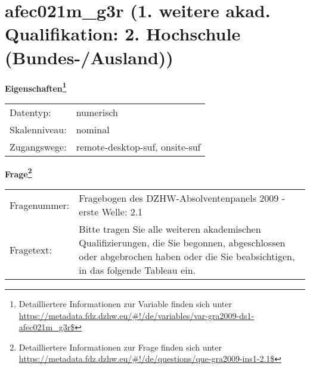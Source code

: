 
    \setcounter{footnote}{0}

    \vspace*{-1.8cm}
	\section{afec021m\_g3r (1. weitere akad. Qualifikation: 2. Hochschule (Bundes-/Ausland))}
	\label{section:afec021m_g3r}



    \vspace*{0.5cm}
    \noindent\textbf{Eigenschaften\footnote{Detailliertere Informationen zur Variable finden sich unter
		\url{https://metadata.fdz.dzhw.eu/\#!/de/variables/var-gra2009-ds1-afec021m_g3r$}}}\\
	\begin{tabularx}{\hsize}{@{}lX}
	Datentyp: & numerisch \\
	Skalenniveau: & nominal \\
	Zugangswege: &
	  remote-desktop-suf, 
	  onsite-suf
 \\
    \end{tabularx}



				\vspace*{0.5cm}
                \noindent\textbf{Frage\footnote{Detailliertere Informationen zur Frage finden sich unter
		              \url{https://metadata.fdz.dzhw.eu/\#!/de/questions/que-gra2009-ins1-2.1$}}}\\
				\begin{tabularx}{\hsize}{@{}lX}
					Fragenummer: &
					  Fragebogen des DZHW-Absolventenpanels 2009 - erste Welle:
					  2.1
 \\
					Fragetext: & Bitte tragen Sie alle weiteren akademischen Qualifizierungen, die Sie begonnen, abgeschlossen oder abgebrochen haben oder die Sie beabsichtigen, in das folgende Tableau ein. \\
				\end{tabularx}





